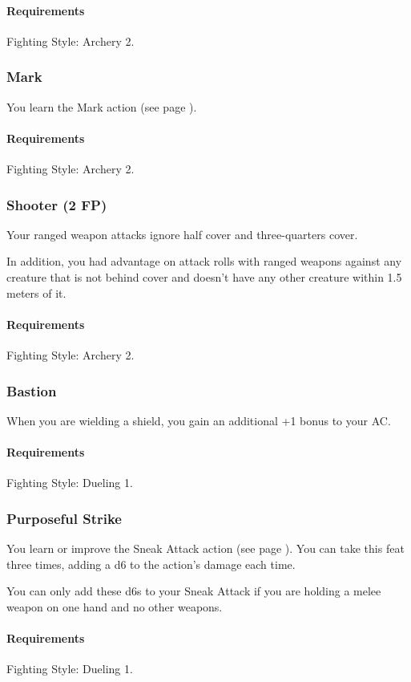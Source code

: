     \paragraph{Requirements} Fighting Style: Archery 2.
\subsubsection{Mark} \label{feat::mark}
    You learn the Mark action (see page \pageref{act::mark}).
    \paragraph{Requirements} Fighting Style: Archery 2.
\subsubsection{Shooter (2 FP)} \label{feat::shooter}
    Your ranged weapon attacks ignore half cover and three-quarters cover.

    In addition, you had advantage on attack rolls with ranged weapons against any creature that is not behind cover and doesn't have any other creature within 1.5 meters of it.
    \paragraph{Requirements} Fighting Style: Archery 2.
\subsubsection{Bastion} \label{feat::bastion}
    When you are wielding a shield, you gain an additional +1 bonus to your AC.
    \paragraph{Requirements} Fighting Style: Dueling 1.
\subsubsection{Purposeful Strike} \label{feat::purposefulstrike}
    You learn or improve the Sneak Attack action (see page \pageref{act:sneakattack}).
    You can take this feat three times, adding a d6 to the action's damage each time.

    You can only add these d6s to your Sneak Attack if you are holding a melee weapon on one hand and no other weapons.
    \paragraph{Requirements} Fighting Style: Dueling 1.
